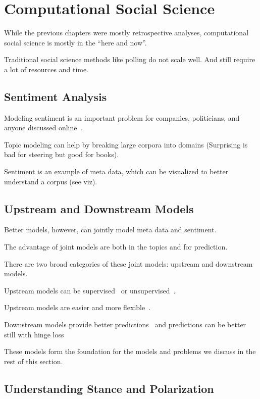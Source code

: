 
\chapter{Computational Social Science}
\label{ch:css}

While the previous chapters were mostly retrospective analyses, computational
social science is mostly in the ``here and now''.

 Traditional social science methods like polling do not scale well. And still
 require a lot of resources and time.

\section{Sentiment Analysis}

Modeling sentiment is an important problem for companies, politicians,
and anyone discussed online~\citep{pang-08}.

Topic modeling can help by breaking large corpora into domains
(Surprising is bad for steering but good for books).

Sentiment is an example of meta data, which can be visualized to
better understand a corpus (see viz).

\section{Upstream and Downstream Models}

Better models, however, can jointly model meta data and sentiment.

The advantage of joint models are both in the topics and for
prediction.

There are two broad categories of these joint models: upstream and
downstream models.

Upstream models can be supervised~\citep{mimno-08} or
unsupervised~\citep{lin-09}.

Upstream models are easier and more flexible~\citep{stewart-14}.

Downstream models provide better predictions~\citep{blei-07b} and
predictions can be better still with hinge loss~\citep{zhu-09}

These models form the foundation for the models and problems we
discuss in the rest of this section.

\section{Understanding Stance and Polarization}

